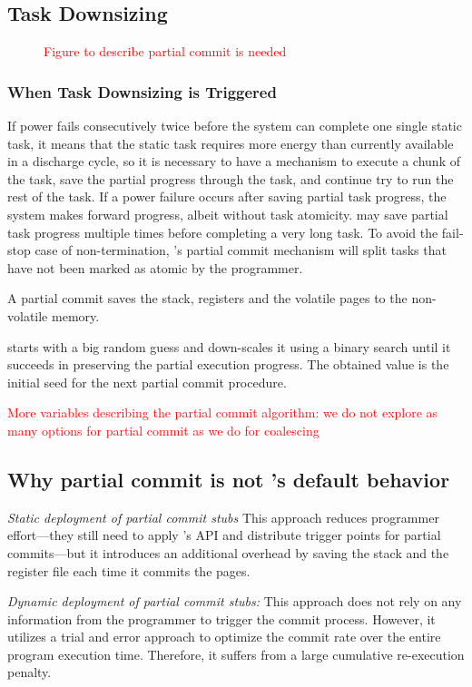\subsection{Task Downsizing}
\label{sec:task_downsizing}

\begin{figure}
	\caption{\textcolor{red}{Figure to describe partial commit is needed}}
\end{figure}

\subsubsection{When Task Downsizing is Triggered}

If power fails consecutively twice before the system can complete one single static task, it means that the static task requires more energy than currently available in a discharge cycle, so it is necessary to have a mechanism to execute a chunk of the task, save the partial progress through the task, and continue try to run the rest of the task. If a power failure occurs after saving partial task progress, the system makes forward progress, albeit without task atomicity. \sys may save partial task progress multiple times before completing a very long task. To avoid the fail-stop case of non-termination, \sys's partial commit mechanism will split tasks that have not been marked as atomic by the programmer.

A partial commit saves the stack, registers and the volatile pages to the non-volatile memory.

\sys starts with a big random guess and down-scales it using a binary search until it succeeds in preserving the partial execution progress. The obtained value is the initial seed for the next partial commit procedure.

\textcolor{red}{More variables describing the partial commit algorithm: we do not explore as many options for partial commit as we do for coalescing}

\subsection{Why partial commit is not \sys's default behavior}

\emph{Static deployment of partial commit stubs} This approach reduces programmer effort---they still need to apply \sys's API and distribute trigger points for partial commits---but it introduces an additional overhead by saving the stack and the register file each time it commits the pages. 

\emph{Dynamic deployment of partial commit stubs:} This approach does not rely on any information from the programmer to trigger the commit process. However, it utilizes a trial and error approach to optimize the commit rate over the entire program execution time. Therefore, it suffers from a large cumulative re-execution penalty.  